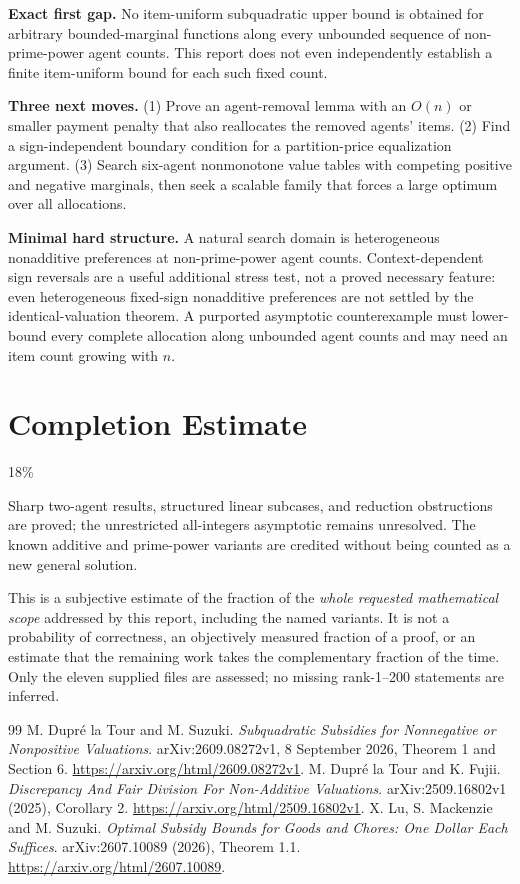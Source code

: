 \documentclass[11pt,a4paper]{article}
\theoremstyle{remark}\newtheorem{remark}[theorem]{Remark}
\begin{document}
\textbf{Exact first gap.} No item-uniform subquadratic upper bound is obtained for arbitrary bounded-marginal functions along every unbounded sequence of non-prime-power agent counts. This report does not even independently establish a finite item-uniform bound for each such fixed count.

\textbf{Three next moves.} (1) Prove an agent-removal lemma with an $O(n)$ or smaller payment penalty that also reallocates the removed agents' items. (2) Find a sign-independent boundary condition for a partition-price equalization argument. (3) Search six-agent nonmonotone value tables with competing positive and negative marginals, then seek a scalable family that forces a large optimum over all allocations.

\textbf{Minimal hard structure.} A natural search domain is heterogeneous nonadditive preferences at non-prime-power agent counts. Context-dependent sign reversals are a useful additional stress test, not a proved necessary feature: even heterogeneous fixed-sign nonadditive preferences are not settled by the identical-valuation theorem. A purported asymptotic counterexample must lower-bound every complete allocation along unbounded agent counts and may need an item count growing with $n$.

\section{Completion Estimate}
18\%

Sharp two-agent results, structured linear subcases, and reduction obstructions are proved; the unrestricted all-integers asymptotic remains unresolved. The known additive and prime-power variants are credited without being counted as a new general solution.

This is a subjective estimate of the fraction of the \emph{whole requested mathematical scope} addressed by this report, including the named variants. It is not a probability of correctness, an objectively measured fraction of a proof, or an estimate that the remaining work takes the complementary fraction of the time. Only the eleven supplied files are assessed; no missing rank-1--200 statements are inferred.

\begin{thebibliography}{99}
 M. Dupr\'e la Tour and M. Suzuki. \emph{Subquadratic Subsidies for Nonnegative or Nonpositive Valuations}. arXiv:2609.08272v1, 8 September 2026, Theorem 1 and Section 6. \url{https://arxiv.org/html/2609.08272v1}.
 M. Dupr\'e la Tour and K. Fujii. \emph{Discrepancy And Fair Division For Non-Additive Valuations}. arXiv:2509.16802v1 (2025), Corollary 2. \url{https://arxiv.org/html/2509.16802v1}.
 X. Lu, S. Mackenzie and M. Suzuki. \emph{Optimal Subsidy Bounds for Goods and Chores: One Dollar Each Suffices}. arXiv:2607.10089 (2026), Theorem 1.1. \url{https://arxiv.org/html/2607.10089}.
\end{thebibliography}
\end{document}
